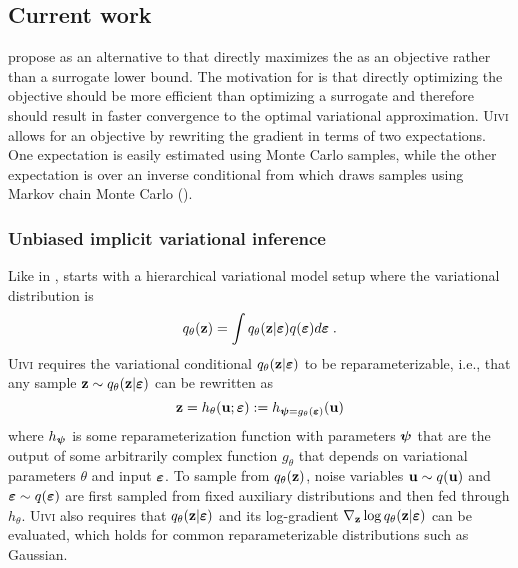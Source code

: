 \documentclass[10pt]{article}
\begin{document}
\subsection{Current work} \label{an:uivi}

\citet{Titsias:2019} propose \uivi as an alternative to \sivi that directly maximizes the \elbo as an objective rather than a surrogate lower bound. The motivation for \uivi is that directly optimizing the \elbo objective should be more efficient than optimizing a surrogate and therefore should result in faster convergence to the optimal variational approximation. \textsc{Uivi} allows for an \elbo objective by rewriting the \elbo gradient in terms of two expectations. One expectation is easily estimated using Monte Carlo samples, while the other expectation is over an inverse conditional from which \uivi draws samples using Markov chain Monte Carlo (\mcmc).

\subsubsection{Unbiased implicit variational inference}

Like in \sivi, \uivi starts with a hierarchical variational model setup where the variational distribution is
\[
q_\theta(\mathbf{z}) = \int q_\theta(\mathbf{z}|\bm{\varepsilon})q(\bm{\varepsilon})d\bm{\varepsilon} \;.
\]
\textsc{Uivi} requires the variational conditional $q_\theta(\mathbf{z}|\bm{\varepsilon})$ to be reparameterizable, i.e., that any sample $\mathbf{z}\sim q_\theta(\mathbf{z}|\bm{\varepsilon})$ can be rewritten as
\[
\mathbf{z} = h_\theta(\mathbf{u};\bm{\varepsilon}) := h_{\bm{\psi}=g_\theta(\bm{\varepsilon})}(\mathbf{u}) 
\]
where $h_{\bm{\psi}}$ is some reparameterization function with parameters $\bm{\psi}$ that are the output of some arbitrarily complex function $g_\theta$ that depends on variational parameters $\theta$ and input $\bm{\varepsilon}$. To sample from $q_\theta(\mathbf{z})$, noise variables $\mathbf{u}\sim q(\mathbf{u})$ and $\bm{\varepsilon}\sim q(\bm{\varepsilon})$ are first sampled from fixed auxiliary distributions and then fed through $h_\theta$. \textsc{Uivi} also requires that $q_\theta(\mathbf{z}|\bm{\varepsilon})$ and its log-gradient $\nabla_{\mathbf{z}}\log q_\theta(\mathbf{z}|\bm{\varepsilon})$ can be evaluated, which holds for common reparameterizable distributions such as Gaussian.
\\
\end{document}
